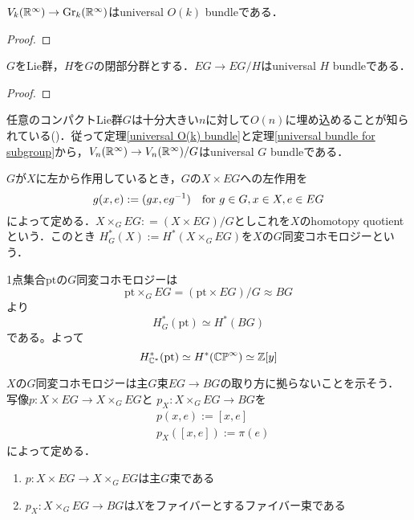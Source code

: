 \begin{prop}\label{universal O(k) bundle}
  $V_k(\mathbb{R}^\infty)\rightarrow \text{Gr}_k(\mathbb{R}^\infty)$はuniversal $O(k)$ bundleである．
\end{prop}

\begin{proof}
  
\end{proof}

\begin{theo}\label{universal bundle for subgroup}
  $G$をLie群，$H$を$G$の閉部分群とする．$EG\rightarrow EG/H$はuniversal $H$ bundleである．
\end{theo}

\begin{proof}
  
\end{proof}

任意のコンパクトLie群$G$は十分大きい$n$に対して$O(n)$に埋め込めることが知られている()．従って定理\ref{universal O(k) bundle}と定理\ref{universal bundle for subgroup}から，$V_n(\mathbb{R}^\infty)\rightarrow V_n(\mathbb{R}^\infty)/G$はuniversal $G$ bundleである．

\begin{defin}
  $G$が$X$に左から作用しているとき，$G$の$X\times EG$への左作用を
  \[
  g(x, e) := (gx, eg^{-1}) \quad \text{for } g\in G, x\in X, e\in EG 
  \]
  によって定める．$X\times_GEG\colon=(X\times EG)/G$としこれを$X$のhomotopy quotient という．このとき
  $H^*_G(X):=H^*(X\times_GEG)$を$X$の$G$同変コホモロジーという．
\end{defin}

\begin{eg}
  1点集合$\text{pt}$の$G$同変コホモロジーは
  \[
  \text{pt}\times_GEG=(\text{pt}\times EG)/G\approx BG
  \]
  より
  \[
  H^*_G(\text{pt})\simeq H^*(BG)
  \]
  である。よって
  \[
  H^*_{\mathbb{C}^*}(\text{pt})\simeq H^*(\mathbb{CP}^\infty)\simeq \mathbb{Z}[y]
  \]
\end{eg}


$X$の$G$同変コホモロジーは主$G$束$EG\rightarrow BG$の取り方に拠らないことを示そう．
写像$p\colon X\times EG\rightarrow X\times_GEG$と $p_X\colon X\times_GEG\rightarrow BG$を
\begin{align*}
  &p(x, e):=[x, e]\\
  &p_X([x, e]):=\pi(e)
\end{align*}
によって定める．

\begin{prop}
  \:
  \begin{enumerate}
    \item $p\colon X\times EG\rightarrow X\times_GEG$は主$G$束である
    \item $p_X\colon X\times_GEG\rightarrow BG$は$X$をファイバーとするファイバー束である
  \end{enumerate}
\end{prop}

